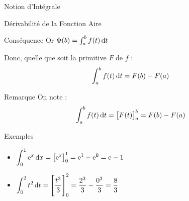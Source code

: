 \documentclass{coursbook}
\begin{document}
\begin{Gpartie}{Notion d'Intégrale}
\begin{Spartie}{Dérivabilité de la Fonction Aire}
\begin{SSpartie}{Conséquence}
                Or $\Phi(b)=\int_a^b f(t)\,\mathrm{d}t$
                
                Donc, quelle que soit la primitive $F$ de $f$ : \[\int_a^b f(t)\,\mathrm{d}t=F(b)-F(a)\]
            \end{SSpartie}
            \begin{SSpartie}{Remarque} 
                On note : \[\int_a^b f(t)\,\mathrm{d}t=\big[F(t)\big]_a^b=F(b)-F(a)\]
            \end{SSpartie}
            \begin{SSpartie}{Exemples} 
                \begin{itemize}
                    \item $\displaystyle \int_0^1\mathrm{e}^x\,\mathrm{d}x=\big[\mathrm{e}^x\big]_0^1=\mathrm{e}^1-\mathrm{e}^0=\mathrm{e}-1$
                    \item $\displaystyle \int_0^2t^2\dt=\Bigg[\frac{t^3}{3}\Bigg]_0^2=\frac{2^3}{3}-\frac{0^3}{3}=\frac{8}{3}$
                \end{itemize}
            \end{SSpartie}
        \end{Spartie}
    \end{Gpartie} \pagebreak
\end{document}
